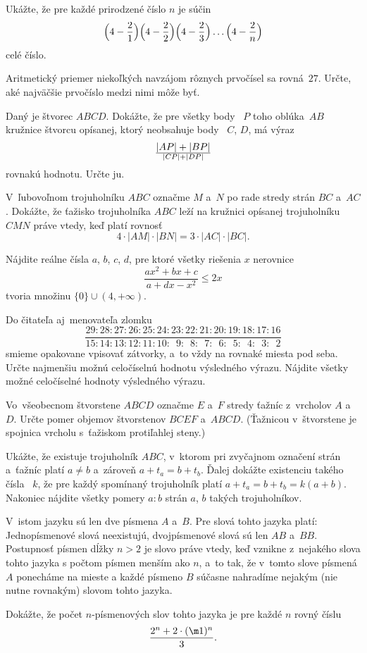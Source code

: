 {%
Ukážte, že pre každé prirodzené číslo $n$ je súčin
$$
\Bigl(4-\frac21\Bigr)
\Bigl(4-\frac22\Bigr)
\Bigl(4-\frac23\Bigr)\dots
\Bigl(4-\frac2n\Bigr)
$$
celé číslo.}

{%
Aritmetický priemer niekoľkých navzájom rôznych prvočísel sa rovná~$27$. Určte, aké najväčšie prvočíslo medzi nimi môže byť.}

{%
Daný je štvorec $ABCD$. Dokážte, že pre všetky body~ $P$ toho
oblúka~$AB$ kružnice štvorcu opísanej, ktorý neobsahuje body~ $C$,
$D$, má výraz
$$
|AP|+|BP|\over|CP|+|DP|
$$
rovnakú hodnotu. Určte ju.}

{%
V~ľubovoľnom trojuholníku $ABC$ označme $M$ a~$N$ po rade
stredy strán $BC$ a~$AC$. Dokážte, že ťažisko trojuholníka $ABC$ leží
na kružnici opísanej trojuholníku $CMN$ práve vtedy, keď platí rovnosť
$$
4\cdot|AM|\cdot|BN|=3\cdot|AC|\cdot|BC|.
$$}

{%
Nájdite reálne čísla $a$, $b$, $c$, $d$, pre
ktoré všetky riešenia $x$ nerovnice
$$
\frac{ax^2+bx+c}{a+dx-x^2}\le 2x
$$
tvoria množinu $\{0\}\cup(4,+\infty)$.}

{%
Do čitateľa aj~menovateľa zlomku
$$
\frac{29:28:27:26:25:24:23:22:21:20:19:18:17:16}
{15:14:13:12:11:10:\phantom{2}9:\phantom{2}8:\phantom{2}7:\phantom{2}6:\phantom{1}5
:\phantom{1}4:\phantom{1}3:\phantom{1}2}
$$
smieme opakovane vpisovať zátvorky, a~to vždy na rovnaké miesta pod
seba.
 Určte najmenšiu možnú celočíselnú hodnotu výsledného výrazu.
 Nájdite všetky možné celočíselné hodnoty výsledného výrazu.
}

{%
Vo~všeobecnom štvorstene $ABCD$ označme $E$ a~$F$
stredy ťažníc z~vrcholov $A$ a~$D$. Určte
pomer objemov štvorstenov $BCEF$ a~$ABCD$. (Ťažnicou v~štvorstene je
spojnica vrcholu s~ťažiskom protiľahlej steny.)}

{%
Ukážte, že existuje trojuholník $ABC$, v~ktorom pri zvyčajnom označení
strán a~ťažníc platí $a\ne b$ a~zároveň $a+t_a=b+t_b$. Ďalej
dokážte existenciu takého čísla~ $k$, že pre každý spomínaný trojuholník
platí $a+t_a=b+t_b=k(a+b)$. Nakoniec nájdite všetky pomery
$a:b$ strán $a$, $b$ takých trojuholníkov.}

{%
V~istom jazyku sú len dve písmena $A$ a~$B$.
Pre slová tohto jazyka platí:
 Jednopísmenové slová neexistujú, dvojpísmenové slová sú
len $AB$ a~$BB$.
 Postupnosť písmen dĺžky $n>2$ je slovo
práve vtedy, keď vznikne z~nejakého slova tohto jazyka s počtom písmen
menším ako $n$,
a~to tak, že v~tomto slove písmená $A$ ponecháme na mieste
a každé písmeno $B$ súčasne nahradíme nejakým
(nie nutne rovnakým) slovom tohto jazyka.

Dokážte, že počet $n$-písmenových slov tohto jazyka je pre každé $n$
rovný číslu
$$
\frac{2^n + 2\cdot(\m1)^n}{3}.
$$
}

